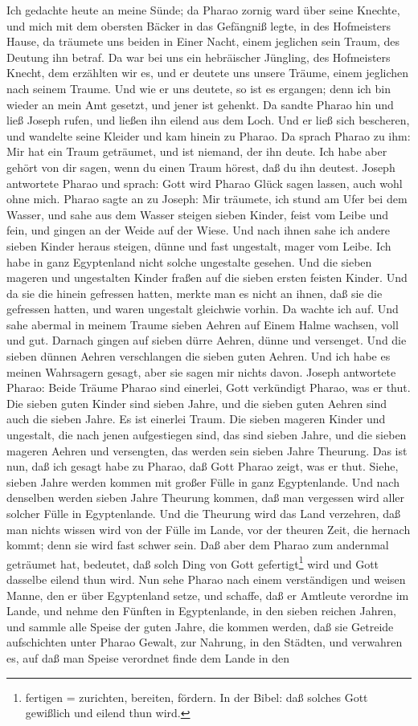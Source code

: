 Ich gedachte heute an meine Sünde; da Pharao zornig ward über seine Knechte, und mich mit dem obersten Bäcker in das Gefängniß legte, in des Hofmeisters Hause, da träumete uns beiden in Einer Nacht, einem jeglichen sein Traum, des Deutung ihn betraf. Da war bei uns ein hebräischer Jüngling, des Hofmeisters Knecht, dem erzählten wir es, und er deutete uns unsere Träume, einem jeglichen nach seinem Traume. Und wie er uns deutete, so ist es ergangen; denn ich bin wieder an mein Amt gesetzt, und jener ist gehenkt. Da sandte Pharao hin und ließ Joseph rufen, und ließen ihn eilend aus dem Loch. Und er ließ sich bescheren, und wandelte seine Kleider und kam hinein zu Pharao. Da sprach Pharao zu ihm: Mir hat ein Traum geträumet, und ist niemand, der ihn deute. Ich habe aber gehört von dir sagen, wenn du einen Traum hörest, daß du ihn deutest. Joseph antwortete Pharao und sprach: Gott wird Pharao Glück sagen lassen, auch wohl ohne mich. Pharao sagte an zu Joseph: Mir träumete, ich stund am Ufer bei dem Wasser, und sahe aus dem Wasser steigen sieben Kinder, feist vom Leibe und fein, und gingen an der Weide auf der Wiese. Und nach ihnen sahe ich andere sieben Kinder heraus steigen, dünne und fast ungestalt, mager vom Leibe. Ich habe in ganz Egyptenland nicht solche ungestalte gesehen. Und die sieben mageren und ungestalten Kinder fraßen auf die sieben ersten feisten Kinder. Und da sie die hinein gefressen hatten, merkte man es nicht an ihnen, daß sie die gefressen hatten, und waren ungestalt gleichwie vorhin. Da wachte ich auf. Und sahe abermal in meinem Traume sieben Aehren auf Einem Halme wachsen, voll und gut. Darnach gingen auf sieben dürre Aehren, dünne und versenget. Und die sieben dünnen Aehren verschlangen die sieben guten Aehren. Und ich habe es meinen Wahrsagern gesagt, aber sie sagen mir nichts davon. Joseph antwortete Pharao: Beide Träume Pharao sind einerlei, Gott verkündigt Pharao, was er thut. Die sieben guten Kinder sind sieben Jahre, und die sieben guten Aehren sind auch die sieben Jahre. Es ist einerlei Traum. Die sieben mageren Kinder und ungestalt, die nach jenen aufgestiegen sind, das sind sieben Jahre, und die sieben mageren Aehren und versengten, das werden sein sieben Jahre Theurung. Das ist nun, daß ich gesagt habe zu Pharao, daß Gott Pharao zeigt, was er thut. Siehe, sieben Jahre werden kommen mit großer Fülle in ganz Egyptenlande. Und nach denselben werden sieben Jahre Theurung kommen, daß man vergessen wird aller solcher Fülle in Egyptenlande. Und die Theurung wird das Land verzehren, daß man nichts wissen wird von der Fülle im Lande, vor der theuren Zeit, die hernach kommt; denn sie wird fast schwer sein. Daß aber dem Pharao zum andernmal geträumet hat, bedeutet, daß solch Ding von Gott gefertigt\footnote{fertigen = zurichten, bereiten, fördern. In der Bibel: daß solches Gott gewißlich und eilend thun wird.} wird und Gott dasselbe eilend thun wird. Nun sehe Pharao nach einem verständigen und weisen Manne, den er über Egyptenland setze, und schaffe, daß er Amtleute verordne im Lande, und nehme den Fünften in Egyptenlande, in den sieben reichen Jahren, und sammle alle Speise der guten Jahre, die kommen werden, daß sie Getreide aufschichten unter Pharao Gewalt, zur Nahrung, in den Städten, und verwahren es, auf daß man Speise verordnet finde dem Lande in den 